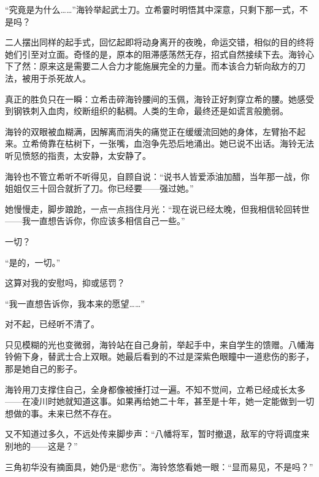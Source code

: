 \documentclass{article}
\begin{document}
“究竟是为什么……”海铃举起武士刀。立希霎时明悟其中深意，只剩下那一式，不是吗？



二人摆出同样的起手式，回忆起即将动身离开的夜晚，命运交错，相似的目的终将她们引至对立面。奇怪的是，原本的阻滞感荡然无存，招式自然接续下去。海铃心下了然：原来这是需要二人合力才能施展完全的力量。而本该合力斩向敌方的刀法，被用于杀死故人。



真正的胜负只在一瞬：立希击碎海铃腰间的玉佩，海铃正好刺穿立希的腰。她感受到钢铁刺入血肉，绞断组织的黏稠。人类的生命，最终还是如谎言般脆弱。



海铃的双眼被血糊满，因解离而消失的痛觉正在缓缓流回她的身体，左臂抬不起来。立希倚靠在枯树下，一张嘴，血泡争先恐后地涌出。她已说不出话。海铃无法听见愤怒的指责，太安静，太安静了。



海铃也不管立希听不听得见，自顾自说：“说书人皆爱添油加醋，当年那一战，你姐姐仅三十回合就折了刀。你已经要——强过她。”



她慢慢走，脚步踉跄，一点一点挡住月光：“现在说已经太晚，但我相信轮回转世——我一直想告诉你，你应该多相信自己一些。”



一切？



“是的，一切。”



这算对我的安慰吗，抑或惩罚？



“我一直想告诉你，我本来的愿望……”



对不起，已经听不清了。



只见模糊的光也变微弱，海铃站在自己身前，举起手中，来自学生的馈赠。八幡海铃俯下身，替武士合上双眼。她最后看到的不过是深紫色眼瞳中一道悲伤的影子，那是她自己的影子。



海铃用刀支撑住自己，全身都像被捶打过一遍。不知不觉间，立希已经成长太多——在凌川时她就知道这事。如果再给她二十年，甚至是十年，她一定能做到一切想做的事。未来已然不存在。



又不知道过多久，不远处传来脚步声：“八幡将军，暂时撤退，敌军的守将调度来别地的——这是？”



三角初华没有摘面具，她仍是“悲伤”。海铃悠悠看她一眼：“显而易见，不是吗？”
\end{document}
